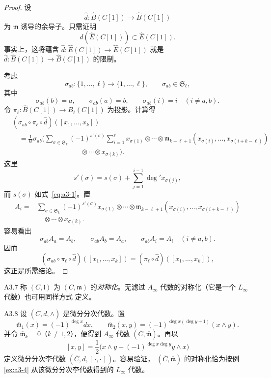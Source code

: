 \begin{proof}
设
\[
 \widehat d\colon\widehat B(C[1])\longrightarrow\widehat B(C[1])
\]
为 $\mathfrak m$ 诱导的余导子。只需证明
\[
 \widehat d(\widehat E(C[1]))\subset\widehat E(C[1]).
\]
事实上，这将蕴含
$\widehat d\colon\widehat E(C[1])\to\widehat E(C[1])$
就是
$\widehat d\colon\widehat B(C[1])\to\widehat B(C[1])$
的限制。

考虑
\[
 \sigma_{ab}\colon\{1,\ldots,\ell\}\longrightarrow
 \{1,\ldots,\ell\},\qquad \sigma_{ab}\in\mathfrak S_\ell,
\]
其中
\[
 \sigma_{ab}(b)=a,\qquad
 \sigma_{ab}(a)=b,\qquad
 \sigma_{ab}(i)=i\quad(i\ne a,b).
\]
令
$\pi_\ell\colon\widehat B(C[1])\to B_\ell(C[1])$ 为投影。计算得
\[
\begin{aligned}
 &(\sigma_{ab}\circ\pi_\ell\circ\widehat d)
 ([x_1,\ldots,x_k])\\
 &\quad=
 \frac1{k!}\sigma_{ab}\Biggl(
 \sum_{\sigma\in\mathfrak S_k}(-1)^{s'(\sigma)}
 \sum_{i=1}^{\ell}
 x_{\sigma(1)}\otimes\cdots\otimes
 \mathfrak m_{k-\ell+1}
 (x_{\sigma(i)},\ldots,x_{\sigma(i+k-\ell)})
 \\
 &\hspace{10em}{}
 \otimes\cdots\otimes x_{\sigma(k)}
 \Biggr).
\end{aligned}
\]
这里
\[
 s'(\sigma)=s(\sigma)
 +\sum_{j=1}^{i-1}\deg' x_{\sigma(j)},
\]
而 $s(\sigma)$ 如式~\eqref{eq:a3-1}。置
\[
\begin{aligned}
 A_i={}&
 \sum_{\sigma\in\mathfrak S_k}(-1)^{s'(\sigma)}
 x_{\sigma(1)}\otimes\cdots\otimes
 \mathfrak m_{k-\ell+1}
 (x_{\sigma(i)},\ldots,x_{\sigma(i+k-\ell)})
 \\
 &\quad{}
 \otimes\cdots\otimes x_{\sigma(k)}.
\end{aligned}
\]
容易看出
\[
 \sigma_{ab}A_a=A_b,\qquad
 \sigma_{ab}A_b=A_a,\qquad
 \sigma_{ab}A_i=A_i\quad(i\ne a,b).
\]
因而
\[
 (\sigma_{ab}\circ\pi_\ell\circ\widehat d)
 ([x_1,\ldots,x_k])
 =(\pi_\ell\circ\widehat d)([x_1,\ldots,x_k]),
\]
这正是所需结论。
\end{proof}

\begin{definition}{A3.7}\label{def:a3-7}
%
称 $(C,\mathfrak l)$ 为 $(C,\mathfrak m)$ 的\emph{对称化}。无滤过
$A_\infty$ 代数的对称化（它是一个 $L_\infty$ 代数）也可用同样方式
定义。
\end{definition}

\begin{example}{A3.8}\label{ex:a3-8}
设 $(\overline C,d,\wedge)$ 是微分分次代数。置
\begin{equation}
 \overline{\mathfrak m}_1(x)=(-1)^{\deg x}dx,\qquad
 \overline{\mathfrak m}_2(x,y)
 =(-1)^{\deg x(\deg y+1)}(x\wedge y).
 \tag{A3.9}\label{eq:a3-9}
\end{equation}
并令 $\overline{\mathfrak m}_k=0$（$k\ne1,2$），便得到 $A_\infty$ 代数
$(\overline C,\overline{\mathfrak m})$。再以
\[
 [x,y]=\frac12
 \bigl(x\wedge y-(-1)^{\deg x\deg y}y\wedge x\bigr)
\]
定义微分分次李代数
$(\overline C,d,[\,\cdot,\cdot\,])$。容易验证，
$(\overline C,\overline{\mathfrak m})$ 的对称化恰为按例
\ref{ex:a3-4} 从该微分分次李代数得到的 $L_\infty$ 代数。
\end{example}

